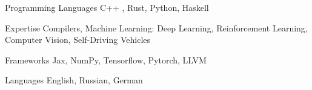 
\begin{cvskills}

  \cvskill
    {Programming Languages}
    {C++ , Rust, Python, Haskell}

  \cvskill
    {Expertise}
    {Compilers, Machine Learning: Deep Learning, Reinforcement Learning,
    Computer Vision, Self-Driving Vehicles}

  \cvskill
    {Frameworks}
    {Jax, NumPy, Tensorflow, Pytorch, LLVM}

  \cvskill
    {Languages}
    {English, Russian, German}

\end{cvskills}
